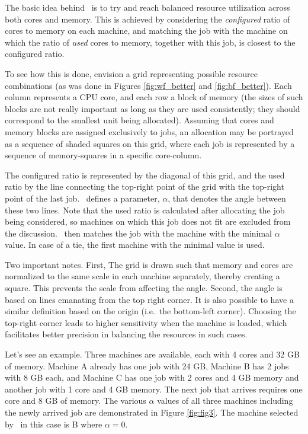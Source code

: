 The basic idea behind \mif\ is to try and reach balanced resource
utilization across both cores and memory.
This is achieved by considering the \textit{configured} ratio of cores
to memory on each machine, and matching the job with the machine on
which the ratio of \textit{used} cores to memory, together with this
job, is closest to the configured ratio.

To see how this is done, envision a grid representing possible
resource combinations (as was done in Figures \ref{fig:wf_better} and
\ref{fig:bf_better}).
Each column represents a CPU core, and each row a block of memory (the
sizes of such blocks are not really important as long as they are used
consistently; they should correspond to the smallest unit being
allocated).
Assuming that cores and memory blocks are assigned exclusively to
jobs, an allocation may be portrayed as a sequence of shaded squares
on this grid, where each job is represented by a sequence of
memory-squares in a specific core-column.

The configured ratio is represented by the diagonal of this grid, and
the used ratio by the line connecting the top-right point of the grid
with the top-right point of the last job.
\mif\ defines a parameter, $\alpha$, that denotes the angle between
these two lines.
Note that the used ratio is calculated after allocating the job being
considered, so machines on which this job does not fit are excluded
from the discussion.
\mif\ then matches the job with the machine with the minimal $\alpha$
value.
In case of a tie, the first machine with the minimal value is used.

Two important notes. First, The grid is drawn such that memory and
cores are normalized to the same scale in each machine separately, thereby
creating a square.
This prevents the scale from affecting the angle.
Second, the angle is based on lines emanating from the top right corner.
It is also possible to have a similar definition based on the origin
(i.e.\ the bottom-left corner).
Choosing the top-right corner leads to higher sensitivity when the
machine is loaded, which facilitates better precision in balancing the
resources in such cases.

Let's see an example. 
Three machines are available, each with 4 cores and 32 GB of memory.
Machine A already has one job with 24 GB, Machine B has 2 jobs
with 8 GB each, and Machine C has one job with 2 cores and 4 GB memory
and another job with 1 core and 4 GB memory.
The next job that arrives requires one core and 8 GB of memory.
The various $\alpha$ values of all three machines including the newly
arrived job are demonstrated in Figure \ref{fig:fig3}.
The machine selected by \mif\ in this case is B where
$\alpha=0$.

